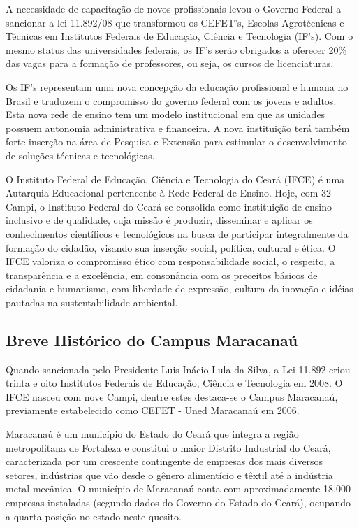 A necessidade de capacitação de novos profissionais levou o Governo Federal a sancionar a lei 11.892/08 que transformou os CEFET’s, Escolas Agrotécnicas e Técnicas em Institutos Federais de Educação, Ciência e Tecnologia (IF’s). Com o mesmo status das universidades federais, os IF’s serão obrigados a oferecer 20\% das vagas para a formação de professores, ou seja, os cursos de licenciaturas.

Os IF’s representam uma nova concepção da educação profissional e humana no Brasil e traduzem o compromisso do governo federal com os jovens e adultos. Esta nova rede de ensino tem um modelo institucional em que as unidades possuem autonomia administrativa e financeira. A nova instituição terá também forte inserção na área de Pesquisa e Extensão para estimular o desenvolvimento de soluções técnicas e tecnológicas.

O Instituto Federal de Educação, Ciência e Tecnologia do Ceará (IFCE) é uma Autarquia Educacional pertencente à Rede Federal de Ensino. Hoje, com 32 Campi, o Instituto Federal do Ceará se consolida como instituição de ensino inclusivo e de qualidade, cuja missão é produzir, disseminar e aplicar os conhecimentos científicos e tecnológicos na busca de participar integralmente da formação do cidadão, visando sua inserção social, política, cultural e ética.  O IFCE valoriza o compromisso ético com responsabilidade social, o respeito, a transparência e a excelência, em consonância com os preceitos básicos de cidadania e humanismo, com liberdade de expressão, cultura da inovação e idéias pautadas na sustentabilidade ambiental.

\subsection{Breve Histórico do Campus Maracanaú}

Quando sancionada pelo Presidente Luis Inácio Lula da Silva, a Lei 11.892 criou trinta e oito Institutos Federais de Educação, Ciência e Tecnologia em 2008. O IFCE nasceu com nove Campi, dentre estes destaca-se o Campus Maracanaú, previamente estabelecido como CEFET - Uned Maracanaú em 2006.

Maracanaú é um município do Estado do Ceará que integra a região metropolitana de Fortaleza e constitui o maior Distrito Industrial do Ceará, caracterizada por um crescente contingente de empresas dos mais diversos setores, indústrias que vão desde o gênero alimentício e têxtil até a indústria metal-mecânica. O município de Maracanaú conta com aproximadamente 18.000 empresas instaladas (segundo dados do Governo do Estado do Ceará), ocupando a quarta posição no estado neste quesito.


